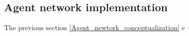 \subsection{Agent network implementation}

The previous section \ref{Agent_newtork_conceptualization} e 


